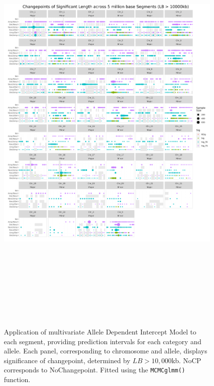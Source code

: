 \begin{figure}[H]
\centering
\includegraphics[width = 1\textwidth, height = 22cm]{../figures/Chapter_6/PerSegments_MCMC_10000kb_fivemillion_Thesis.png}
\caption[Application of multivariate Allele Dependent Intercept Model to each segment, providing prediction intervals for each category and allele. Significance determined by $LB > 10,000$kb.]{Application of multivariate Allele Dependent Intercept Model to each segment, providing prediction intervals for each category and allele. Each panel, corresponding to chromosome and allele, displays significance of changepoint, determined by $LB > 10,000$kb. NoCP corresponds to NoChangepoint. Fitted using the \texttt{MCMCglmm()} function.}
\label{fig:PerSegment_MCMC_10000}
\end{figure}


